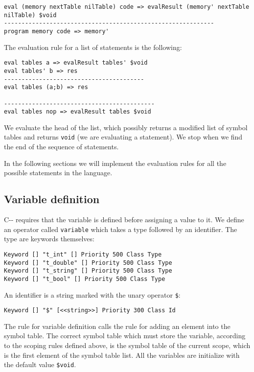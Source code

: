 \begin{lstlisting}
eval (memory nextTable nilTable) code => evalResult (memory' nextTable nilTable) $void
------------------------------------------------------------
program memory code => memory'
\end{lstlisting}

\noindent
The evaluation rule for a list of statements is the following:

\begin{lstlisting}
eval tables a => evalResult tables' $void
eval tables' b => res
----------------------------------------
eval tables (a;b) => res

-------------------------------------------
eval tables nop => evalResult tables $void
\end{lstlisting}

\noindent
We evaluate the head of the list, which possibly returns a modified list of symbol tables and returns \texttt{void} (we are evaluating a statement). We stop when we find the end of the sequence of statements.

In the following sections we will implement the evaluation rules for all the possible statements in the language.

\subsection{Variable definition}
C-{}- requires that the variable is defined before assigning a value to it. We define an operator called \texttt{variable} which takes a type followed by an identifier. The type are keywords themselves:

\begin{lstlisting}
Keyword [] "t_int" [] Priority 500 Class Type
Keyword [] "t_double" [] Priority 500 Class Type
Keyword [] "t_string" [] Priority 500 Class Type
Keyword [] "t_bool" [] Priority 500 Class Type
\end{lstlisting}

\noindent
An identifier is a string marked with the unary operator \texttt{\$}:

\begin{lstlisting}
Keyword [] "$" [<<string>>] Priority 300 Class Id
\end{lstlisting}

\noindent
The rule for variable definition calls the rule for adding an element into the symbol table. The correct symbol table which must store the variable, according to the scoping rules defined above, is the symbol table of the current scope, which is the first element of the symbol table list. All the variables are initialize with the default value \texttt{\$void}.

